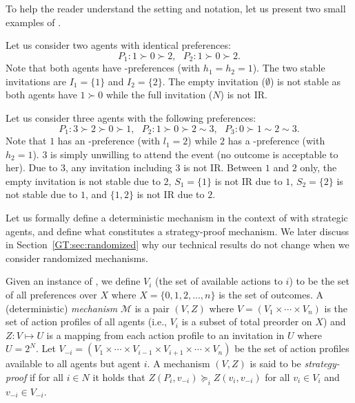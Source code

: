 To help the reader understand the setting and notation, let us present two small examples of \AOIP.

\begin{example} \label{GT:eg:multiple_stable}
	Let us consider two agents with identical preferences: 
	\begin{equation*}
				P_1: 1 \succ 0 \succ 2,~~~ P_2: 1 \succ 0 \succ 2.		
	\end{equation*}
	Note that both agents have \DEC-preferences (with $h_1 = h_2 = 1$).
	The two stable invitations are $I_1 = \{1\}$ and $I_2 = \{2\}$. 
	The empty invitation ($\emptyset$) is not stable as both agents have $1 \succ 0$ while the full invitation ($N$) is not IR. 
\end{example}

\begin{example} \label{GT:eg:noStableSet}
	Let us consider three agents with the following preferences: 
	\begin{equation*}
				P_1: 3\succ 2 \succ 0 \succ 1,~~~ P_2: 1 \succ 0 \succ 2 \sim 3,~~~ P_3: 0 \succ 1 \sim 2 \sim 3.
	\end{equation*}
	Note that $1$ has an \INC-preference (with $l_1 = 2$) while $2$ has a \DEC-preference (with  $h_2 = 1$). $3$ is simply unwilling to attend the event (no outcome is acceptable to her).
	Due to $3$, any invitation including $3$ is not IR. Between $1$ and $2$ only, the empty invitation is not stable due to $2$, $S_1 = \{1\}$ is not IR due to $1$, $S_2 = \{2\}$ is not stable due to $1$, and $\{1, 2\}$ is not IR due to $2$.
\end{example}

Let us formally define a deterministic mechanism in the context of \AOIPs with strategic agents, and define what constitutes a strategy-proof mechanism. We later discuss in Section~\ref{GT:sec:randomized} why our technical results do not change when we consider randomized mechanisms.

\begin{definition} \label{GT:def:mechanism}
Given an instance of \AOIP, we define $V_i$ (the set of available actions to $i$) to be the set of all preferences over $X$ where $X = \{0, 1, 2, \dots, n\}$ is the set of outcomes. 
A (deterministic) \emph{mechanism} $\mathcal{M}$ is a pair $(V, Z)$ where $V = (V_1 \times \cdots \times V_n)$ is the set of action profiles of all agents (i.e., $V_i$ is a subset of total preorder on $X$) and $Z: V \mapsto U$ is a mapping from each action profile to an invitation in $U$ where $U = 2^{N}$. 
Let $V_{-i} = (V_1 \times \cdots \times V_{i-1} \times V_{i+1} \times \cdots \times V_{n})$ be the set of action profiles available to all agents but agent $i$. A mechanism $(V, Z)$ is said to be \emph{strategy-proof} if for all $i\in N$ it holds that $Z(P_i, v_{-i}) \succeq_i Z(v_i, v_{-i})$ for all $v_i \in V_i$ and $v_{-i} \in V_{-i}$.
\end{definition}

